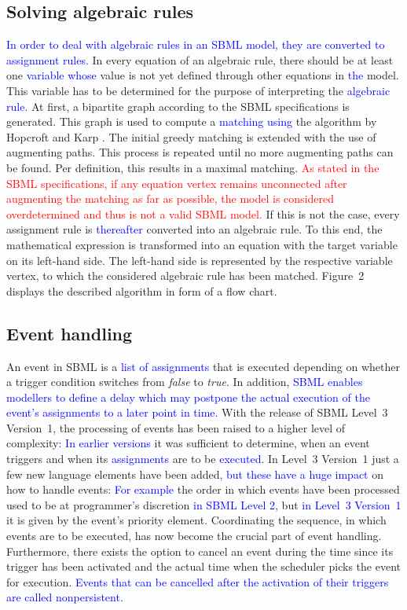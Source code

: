 \documentclass[10pt]{bmc_article}
\newenvironment{bmcformat}{\fussy\setboolean{publ}{true}}{\fussy}
\newcommand{\TODO}[1]{\textcolor{red}{#1}}
\newcommand{\COR}[1]{\textcolor{blue}{#1}}
\newcommand{\true}{\emph{true}\xspace}
\newcommand{\false}{\emph{false}\xspace}
\begin{document}
\begin{bmcformat}
\subsection*{Solving algebraic rules}
\COR{In order to deal with algebraic rules in an \acs{SBML} model, \COR{they} are converted to assignment rules.}
In every equation of an algebraic rule, there should be at least one \COR{variable 
whose} value is not yet defined through other equations in \COR{the} model. This variable has to be determined 
for the purpose of interpreting the \COR{algebraic rule}. 
At first, a bipartite graph according to the \acs{SBML} specifications is generated. This graph is used to 
compute a \COR{matching using} the algorithm by Hopcroft and Karp
\cite{hopcroft1973n}. The initial greedy matching is extended with the use of augmenting paths. This process is
repeated until no more augmenting paths can be found. Per definition, this results in a maximal matching. 
\TODO{As stated in the \acs{SBML} specifications, if any equation vertex remains unconnected after augmenting the matching as far as possible, the model is considered overdetermined and thus is not a valid \acs{SBML} model.}
If this is not the case, every assignment rule is \COR{thereafter} converted into an algebraic rule. 
To this end, the mathematical expression is transformed into an equation with the target variable on its left-hand side.
The left-hand side is represented by the respective variable vertex, to which the considered algebraic rule has been matched.
Figure~2 displays the described algorithm in form of a flow chart.


\subsection*{Event handling}
An event in \acs{SBML} is a \COR{list of assignments} that is executed depending on whether a trigger 
condition switches from \false to \true.
In addition, \COR{\acs{SBML} enables modellers to define a delay which may postpone the actual execution of the event's assignments
to a later point in time.}
With the release of \acs{SBML} Level~3 Version~1, the processing of events has been
raised to a higher level of complexity\COR{:}
\COR{In earlier versions} it was sufficient to determine, when an event triggers and when its \COR{assignments} are to be \COR{executed}.
In Level~3 Version~1 just a few new language elements have been added\COR{, but these have a huge impact} on how to handle events:
\COR{For example} the order in which events have been processed used to be at programmer\COR{'}s discretion \COR{in \acs{SBML} Level 2}, but \COR{in Level~3 Version~1} it is given by the event's priority element.
Coordinating the sequence, in which events are to be executed, has now become the crucial part of event handling. 
Furthermore, there exists the option to cancel an event during the time since its trigger 
has been activated and the actual time when the scheduler picks the event for execution.
\COR{Events that can be cancelled after the activation of their triggers are called nonpersistent.}


\end{bmcformat}
\end{document}
